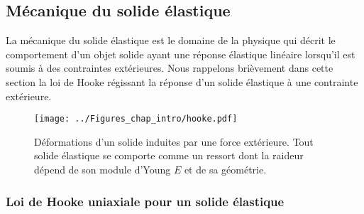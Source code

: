 \subsection{Mécanique du solide élastique}
\label{sec:hook}
La mécanique du solide élastique est le domaine de la physique qui décrit le comportement d'un objet solide ayant une réponse élastique linéaire lorsqu'il est soumis à des contraintes extérieures. Nous rappelons brièvement dans cette section la loi de Hooke régissant la réponse d'un solide élastique à une contrainte extérieure.



\begin{figure}[htb]
\centering
\texttt{[image: ../Figures\_chap\_intro/hooke.pdf]}
\caption[Loi de Hooke pour un ressort]{Déformations d'un solide induites par une force extérieure. Tout solide élastique se comporte comme un ressort dont la raideur dépend de son module d'Young $E$ et de sa géométrie.}
\end{figure}


\newpage
%
%
%
%

\subsubsection{Loi de Hooke uniaxiale pour un solide élastique}


